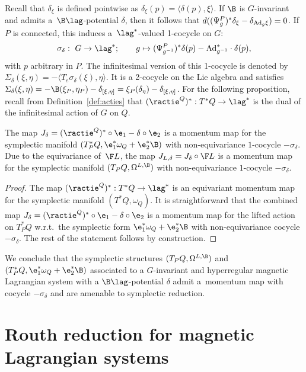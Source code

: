Recall that $\delta_\xi$ is def\/ined pointwise as $\delta_\xi(p) = \langle \delta(p),\xi\rangle$. If $\B$ is $G$-invariant and admits a~$\B\lag$-potential $\delta$, then it follows that $d((\Psi^P_g)^* \delta_\xi - \delta_{{\rm Ad}_g\xi})=0$. If $P$ is connected, this induces a~$\lag^*$-valued 1-cocycle on $G$:
\[
\sigma_\delta: \ G\to \lag^{*}; \qquad g \mapsto (\Psi^{P}_{g^{-1}})^{*}\delta(p) - {\rm Ad}^{*}_{g^{-1}}\cdot \delta(p),
\]
with $p$ arbitrary in $P$. The inf\/initesimal version of this 1-cocycle is denoted by $\Sigma_\delta(\xi,\eta)=-\langle T_e\sigma_\delta(\xi),\eta\rangle$. It is a 2-cocycle on the Lie algebra and satisf\/ies  $\Sigma_\delta(\xi,\eta)= -\B(\xi_{P},\eta_{P})-\delta_{[\xi,\eta]} = \xi_P(\delta_\eta)-\delta_{[\xi,\eta]}$. For the following proposition, recall from Def\/inition~\ref{def:acties} that $(\ractie^Q)^*: T^*Q \to \lag^*$ is the dual of the inf\/initesimal action of $G$ on $Q$.

\begin{proposition}\label{prop:equiv} The map $J_\delta=(\ractie^Q)^*\circ\e_{1}-\delta\circ\e_{2}$ is a momentum map for the symplectic manifold $(T_P^*Q,\e^*_1\omega_Q +\e^*_2 \B)$ with non-equivariance $1$-cocycle $-\sigma_\delta$. Due to the equivariance of~$\F L$, the map $J_{L,\delta}= J_\delta\circ \F L$ is a momentum map for the symplectic manifold $(T_PQ,\Omega^{L,\B})$ with non-equivariance $1$-cocycle $-\sigma_\delta$. \end{proposition}
\begin{proof}
The map $(\ractie^Q)^*: T^*Q\to \lag^*$ is an equivariant momentum map for the symplectic manifold $(T^*Q,\omega_Q)$. It is straightforward that the combined map $J_\delta=(\ractie^Q)^*\circ\e_{1}-\delta\circ\e_{2}$ is a momentum map for the lifted action on $T^{*}_{P}Q$ w.r.t.\ the symplectic form $\e_{1}^{*}\omega_{Q} + \e_{2}^{*}\B$ with non-equivariance cocycle $-\sigma_\delta$. The rest of the statement follows by construction.
\end{proof}

We conclude that the symplectic structures $(T_PQ,\Omega^{L,\B})$ and $(T_P^*Q,\e^*_1\omega_Q +\e^*_2 \B)$ associated to a $G$-invariant and hyperregular magnetic Lagrangian system with a $\B\lag$-potential $\delta$ admit a~momentum map with cocycle $-\sigma_\delta$ and are amenable to symplectic reduction.

\section{Routh reduction for magnetic Lagrangian systems}\label{section5}
